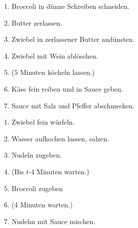 \documentclass{article}
\begin{document}
\begin{minipage}{0.475\textwidth}
    \begin{enumerate}
        \item Broccoli in dünne Schreiben schneiden.
        \item Butter zerlassen.
        \item Zwiebel in zerlassener Butter andünsten.
        \item Zwiebel mit Wein ablöschen.
        \item (5 Minuten köcheln lassen.)
        \item Käse fein reiben und in Sauce geben.
        \item Sauce mit Salz und Pfeffer abschmecken.
    \end{enumerate}
\end{minipage}
\hfill
\begin{minipage}{0.475\textwidth}
    \begin{enumerate}
        \item Zwiebel fein würfeln.
        \item Wasser aufkochen lassen, salzen.
        \item Nudeln zugeben.
        \item (Bis $t$-4 Minuten warten.)
        \item Broccoli zugeben
        \item (4 Minuten warten.)
        \item Nudelm mit Sauce mischen.
    \end{enumerate}
\end{minipage}
\end{document}
